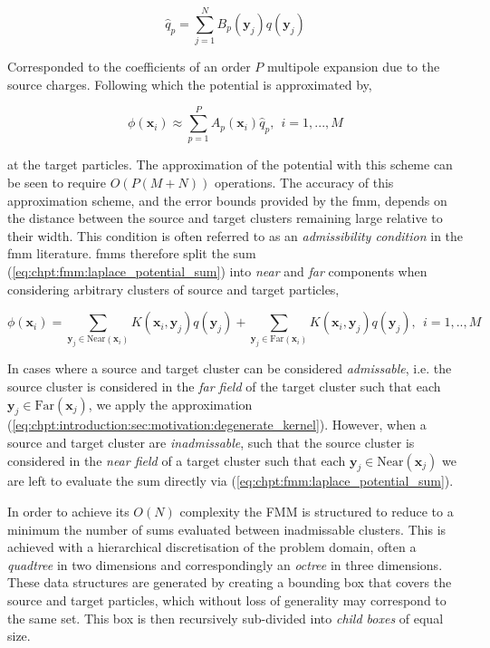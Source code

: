 \begin{equation}
    \hat{q}_p = \sum_{j=1}^N B_p(\mathbf{y}_j)q(\mathbf{y}_j)
\end{equation}

Corresponded to the coefficients of an order $P$ multipole expansion due to the source charges. Following which the potential is approximated by,

\begin{equation}
    \phi(\mathbf{x}_i) \approx \sum_{p=1}^P A_p(\mathbf{x}_i)\hat{q}_p, \> \> i = 1,...,M
\end{equation}

at the target particles. The approximation of the potential with this scheme can be seen to require $O(P(M+N))$ operations. The accuracy of this approximation scheme, and the error bounds provided by the \acrshort{fmm}, depends on the distance between the source and target clusters remaining large relative to their width. This condition is often referred to as an \textit{admissibility condition} in the \acrshort{fmm} literature. \acrshort{fmm}s therefore split the sum (\ref{eq:chpt:fmm:laplace_potential_sum}) into \textit{near} and \textit{far} components when considering arbitrary clusters of source and target particles,

\begin{equation}
    \phi(\mathbf{x}_i) = \sum_{\mathbf{y}_j \in \text{Near}(\mathbf{x}_i)} K(\mathbf{x}_i, \mathbf{y}_j) q(\mathbf{y}_j) +  \sum_{\mathbf{y}_j \in \text{Far}(\mathbf{x}_i)} K(\mathbf{x}_i, \mathbf{y}_j) q(\mathbf{y}_j), \> \> i=1,..,M
\end{equation}

In cases where a source and target cluster can be considered \textit{admissable}, i.e. the source cluster is considered in the \textit{far field} of the target cluster such that each $\mathbf{y}_j \in \text{Far}(\mathbf{x}_j)$, we apply the approximation (\ref{eq:chpt:introduction:sec:motivation:degenerate_kernel}). However, when a source and target cluster are \textit{inadmissable}, such that the source cluster is considered in the \textit{near field} of a target cluster such that each $\mathbf{y}_j \in \text{Near}(\mathbf{x}_j)$ we are left to evaluate the sum directly via (\ref{eq:chpt:fmm:laplace_potential_sum}).

In order to achieve its $O(N)$ complexity the FMM is structured to reduce to a minimum the number of sums evaluated between inadmissable clusters. This is achieved with a hierarchical discretisation of the problem domain, often a \textit{quadtree} in two dimensions and correspondingly an \textit{octree} in three dimensions. These data structures are generated by creating a bounding box that covers the source and target particles, which without loss of generality may correspond to the same set. This box is then recursively sub-divided into \textit{child boxes} of equal size.

